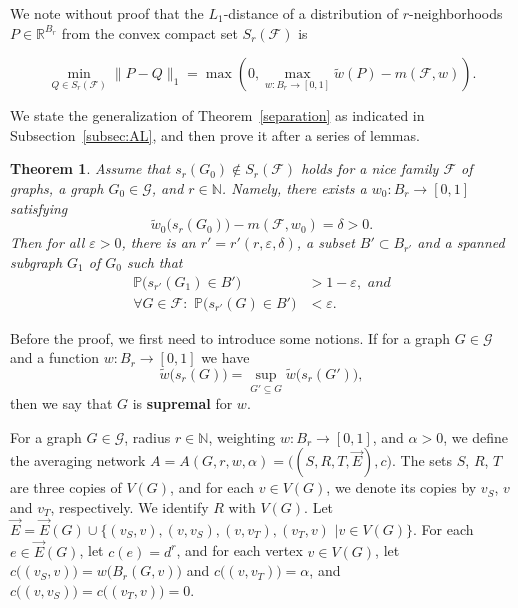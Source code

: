 \documentclass[12pt,a4paper]{article}
\newtheorem{Theorem}{Theorem}
\newcommand{\eps}{\varepsilon}
\newcommand{\vE}{\vec{E}}
\newcommand{\F}{\mathcal{F}}
\newcommand{\G}{\mathcal{G}}
\newcommand{\N}{\mathbb{N}}
\renewcommand{\P}{\mathbb{P}}
\newcommand{\R}{\mathbb{R}}
\renewcommand{\:}{\colon}
\begin{document}
We note without proof that the $L_1$-distance of a distribution of $r$-neighborhoods $P \in \R^{B_r}$ from the convex compact set $S_r(\F)$ is 

\begin{equation}\label{eq:minmaxdist}
\min\limits_{Q\in S_r(\F)} \big\| P-Q \big\|_1= \max(0, \max\limits_{w\: B_r \rightarrow [0, 1]} \tilde{w}(P) - m(\F, w)).
\end{equation}

We state the generalization of Theorem~\ref{separation} as indicated in Subsection~\ref{subsec:AL}, and then prove it after a series of lemmas. 

\begin{Theorem} \label{separation2}
Assume that $s_r(G_0) \notin S_r(\F)$ holds for a nice family $\F$ of graphs, a graph $G_0 \in \G$, and $r\in \N$. 
Namely, there exists a $w_0\: B_r \rightarrow [0, 1]$ satisfying
\begin{equation} \label{deltadef}
\tilde{w}_0\big(s_r(G_0)\big) - m(\F, w_0) = \delta > 0.
\end{equation}
Then for all $\eps > 0$, there is an $r' = r'(r, \eps, \delta)$, a subset $B' \subset B_{r'}$ and a spanned subgraph $G_1$ of $G_0$ such that 
\begin{align*}
\P\big(s_{r'}(G_1) \in B'\big) &> 1 -\eps, \,\,and\\
\forall G \in \F\: \,\, \P\big(s_{r'}(G) \in B'\big) &< \eps. 
\end{align*}
\end{Theorem}

Before the proof, we first need to introduce some notions. 
If for a graph $G \in \G$ and a function $w \: B_r \rightarrow [0, 1]$ we have 
\begin{equation} \label{supeq}
\tilde{w}\big(s_r(G)\big) = \sup_{G' \subseteq G} \tilde{w}\big(s_r(G')\big),
\end{equation}
then we say that $G$ is \textbf{supremal} for $w$.


For a graph $G \in \G$, radius $r \in \N$, weighting $w\: B_r \rightarrow [0, 1]$, and $\alpha > 0$, we define the averaging network $A = A(G, r, w, \alpha) = \big((S, R, T, \vE), c\big)$. The sets $S$, $R$, $T$ are three copies of $V(G)$, and for each $v \in V(G)$, we denote its copies by $v_S$, $v$ and $v_T$, respectively. We identify $R$ with $V(G)$. Let $\vE = \vE(G) \cup \big\{ (v_S, v), (v, v_S), (v, v_T), (v_T, v)$ $\big| v \in V(G) \big\}$. For each $e \in \vE(G)$, let $c(e) = d ^ r$, and for each vertex $v \in V(G)$, let $c\big((v_S, v)\big) = w\big(B_r(G, v)\big)$ and $c\big((v, v_T)\big) = \alpha$, and $c\big((v, v_S)\big) = c\big((v_T, v)\big) = 0$.
\end{document}
